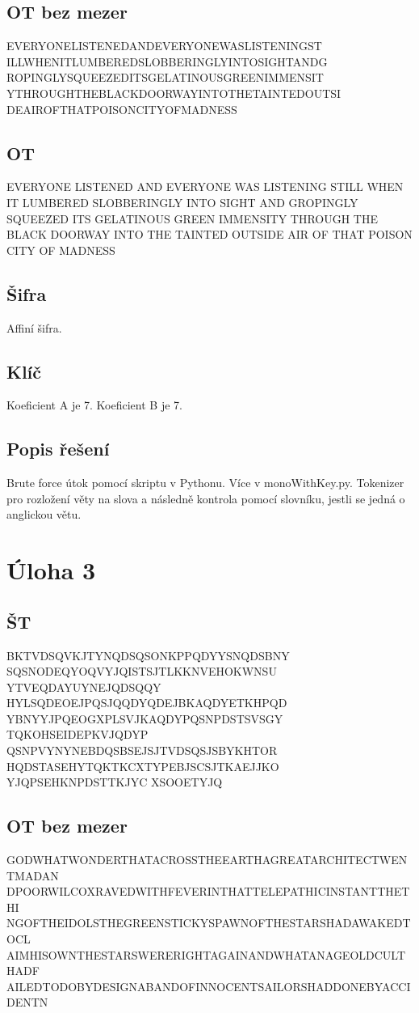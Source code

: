 \documentclass[12pt]{article} %
\begin{document}
\subsection{OT bez mezer}
EVERYONELISTENEDANDEVERYONEWASLISTENINGST
ILLWHENITLUMBEREDSLOBBERINGLYINTOSIGHTANDG
ROPINGLYSQUEEZEDITSGELATINOUSGREENIMMENSIT
YTHROUGHTHEBLACKDOORWAYINTOTHETAINTEDOUTSI
DEAIROFTHATPOISONCITYOFMADNESS
\subsection{OT}
EVERYONE LISTENED AND EVERYONE WAS LISTENING STILL
WHEN IT LUMBERED SLOBBERINGLY INTO SIGHT AND GROPINGLY 
SQUEEZED ITS GELATINOUS GREEN IMMENSITY THROUGH THE BLACK
DOORWAY INTO THE TAINTED OUTSIDE AIR OF THAT
POISON CITY OF MADNESS 
\subsection{Šifra}
Affiní šifra.
\subsection{Klíč}
Koeficient A je 7. Koeficient B je 7.
\subsection{Popis řešení}
Brute force útok pomocí skriptu v Pythonu. Více v monoWithKey.py. Tokenizer pro rozložení věty na slova a následně kontrola pomocí slovníku, jestli se jedná o anglickou větu.




\section{Úloha 3}
\subsection{ŠT}
BKTVDSQVKJTYNQDSQSONKPPQDYYSNQDSBNY
SQSNODEQYOQVYJQISTSJTLKKNVEHOKWNSU
YTVEQDAYUYNEJQDSQQY
HYLSQDEOEJPQSJQQDYQDEJBKAQDYETKHPQD
YBNYYJPQEOGXPLSVJKAQDYPQSNPDSTSVSGY
TQKOHSEIDEPKVJQDYP
QSNPVYNYNEBDQSBSEJSJTVDSQSJSBYKHTOR
HQDSTASEHYTQKTKCXTYPEBJSCSJTKAEJJKO
YJQPSEHKNPDSTTKJYC
XSOOETYJQ

\subsection{OT bez mezer}
GODWHATWONDERTHATACROSSTHEEARTHAGREATARCHITECTWENTMADAN
DPOORWILCOXRAVEDWITHFEVERINTHATTELEPATHICINSTANTTHETHI
NGOFTHEIDOLSTHEGREENSTICKYSPAWNOFTHESTARSHADAWAKEDTOCL
AIMHISOWNTHESTARSWERERIGHTAGAINANDWHATANAGEOLDCULTHADF
AILEDTODOBYDESIGNABANDOFINNOCENTSAILORSHADDONEBYACCIDENTN
\end{document}
